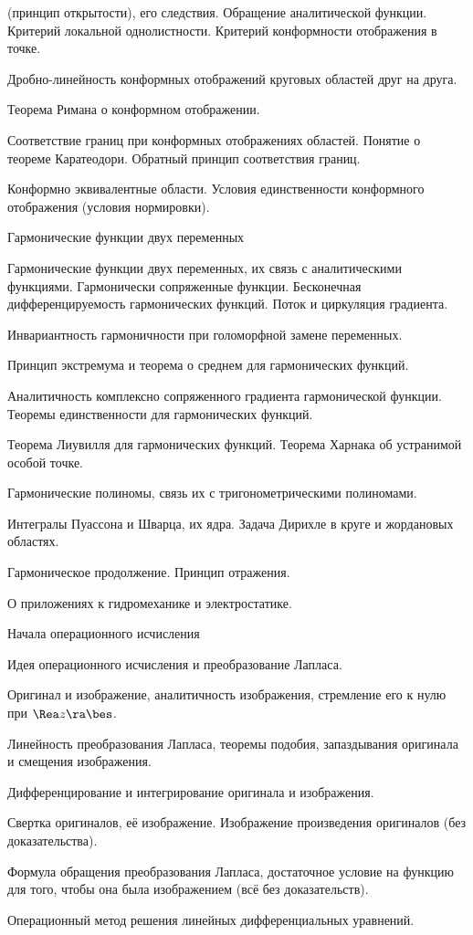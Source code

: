 \documentclass[a4paper]{article}
\begin{document}
\begin{nums}{-2}
\begin{items}{-2}
      (принцип открытости), его следствия. Обращение аналитической функции. Критерий локальной однолистности.
      Критерий конформности отображения в точке.
\item Дробно-линейность конформных отображений круговых областей друг на друга.
\item Теорема Римана о конформном отображении.
\item Соответствие границ при конформных отображениях областей. Понятие о теореме Каратеодори. Обратный
      принцип соответствия границ.
\item Конформно эквивалентные области. Условия единственности конформного отображения (условия нормировки).
\end{items}
\item Гармонические функции двух переменных
\begin{items}{-2}
\item Гармонические функции двух переменных, их связь с аналитическими функциями. Гармонически
      сопряженные функции. Бесконечная дифференцируемость гармонических функций. Поток и циркуляция градиента.
\item Инвариантность гармоничности при голоморфной замене переменных.
\item Принцип экстремума и теорема о среднем для гармонических функций.
\item Аналитичность комплексно сопряженного градиента гармонической функции. Теоремы единственности
      для гармонических функций.
\item Теорема Лиувилля для гармонических функций. Теорема Харнака об устранимой особой точке.
\item Гармонические полиномы, связь их с тригонометрическими полиномами.
\item Интегралы Пуассона и Шварца, их ядра. Задача Дирихле в круге и жордановых областях.
\item Гармоническое продолжение. Принцип отражения.
\item О приложениях к гидромеханике и электростатике.
\end{items}
\item Начала операционного исчисления
\begin{items}{-2}
\item Идея операционного исчисления и преобразование Лапласа.
\item Оригинал и изображение, аналитичность изображения, стремление его к нулю при $\Rea z\ra\bes$.
\item Линейность преобразования Лапласа, теоремы подобия, запаздывания оригинала и смещения изображения.
\item Дифференцирование и интегрирование оригинала и изображения.
\item Свертка оригиналов, её изображение. Изображение произведения оригиналов (без доказательства).
\item Формула обращения преобразования Лапласа, достаточное условие на функцию для того, чтобы она
      была изображением (всё без доказательств).
\item Операционный метод решения линейных дифференциальных уравнений.
\end{items}
\end{nums}
\end{document}
